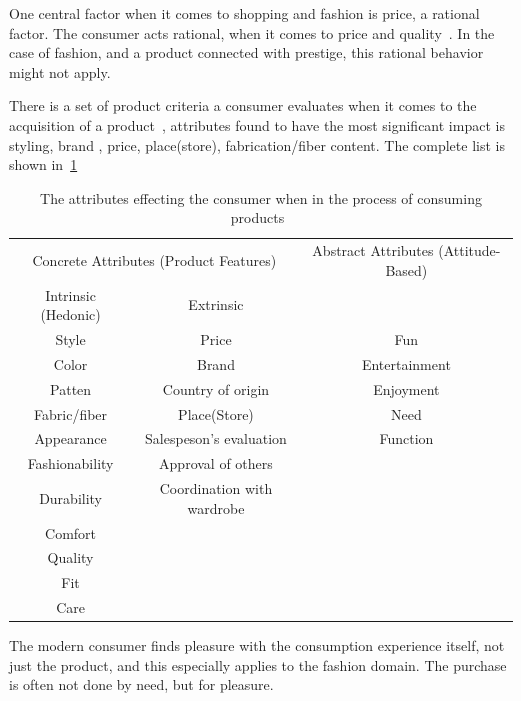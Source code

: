   One central factor when it comes to shopping and fashion is price, a rational factor.
  The consumer acts rational, when it comes to price and quality~\cite{Hanf1994}.
  In the case of fashion, and a product connected with prestige, this rational
  behavior might not apply.

  There is a set of product criteria a consumer evaluates when it comes to the
  acquisition of a product~\cite{dutton2006}, attributes found to have the most
  significant impact is styling, brand , price, place(store), fabrication/fiber
  content.  The complete list is shown in~\ref{table:ConsumersPurchaseDec}


  \begin{table}[H]
      \centering
      \begin{tabular}{ccc}
      \toprule
        \multicolumn{2}{c}{Concrete Attributes (Product Features)} & Abstract Attributes (Attitude-Based) \\
        \cmidrule(r{1em}){1-2}
        \multicolumn{1}{c}{Intrinsic (Hedonic)} & \multicolumn{1}{c}{Extrinsic} 				 	& \\ \midrule
        Style 				& Price						 	& Fun \\
        Color				& Brand 					 	& Entertainment \\
        Patten 				& Country of origin			 	& Enjoyment\\
        Fabric/fiber 		& Place(Store) 				 	& Need \\
        Appearance	   	 	& Salespeson's evaluation	 	&  Function\\
        Fashionability  	& Approval of others 		 	&\\
        Durability			& Coordination with wardrobe 	&\\
        Comfort				&								& \\
        Quality				&								& \\
        Fit					&								& \\
        Care 				&								& \\
      \bottomrule
      \end{tabular}
      \caption[Consumers' Purchase Decisions]{The attributes effecting the consumer when in the process of consuming products~\cite{dutton2006}}
      \label{table:ConsumersPurchaseDec}
  \end{table}

  The modern consumer finds pleasure with the consumption experience itself, not
  just the product, and this especially applies to the fashion domain.  The
  purchase is often not done by need, but for pleasure.

